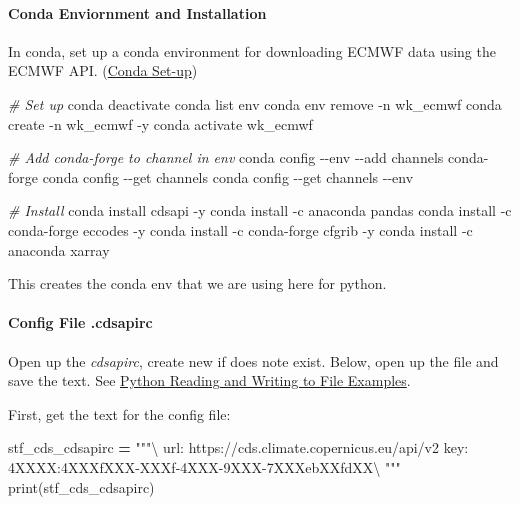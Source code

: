 \documentclass[
]{book}
\newenvironment{Shaded}{\begin{snugshade}}{\end{snugshade}}
\newcommand{\BuiltInTok}[1]{#1}
\newcommand{\CommentTok}[1]{\textcolor[rgb]{0.56,0.35,0.01}{\textit{#1}}}
\newcommand{\ExtensionTok}[1]{#1}
\newcommand{\NormalTok}[1]{#1}
\newcommand{\OperatorTok}[1]{\textcolor[rgb]{0.81,0.36,0.00}{\textbf{#1}}}
\newcommand{\StringTok}[1]{\textcolor[rgb]{0.31,0.60,0.02}{#1}}
\begin{document}
\hypertarget{conda-enviornment-and-installation}{%
\paragraph{Conda Enviornment and Installation}\label{conda-enviornment-and-installation}}

In conda, set up a conda environment for downloading ECMWF data using the ECMWF API. (\href{https://fanwangecon.github.io/Tex4Econ/nontex/install/windows/fn_installations.html}{Conda Set-up})

\begin{Shaded}
\begin{Highlighting}[]
\CommentTok{\# Set up}
\ExtensionTok{conda}\NormalTok{ deactivate}
\ExtensionTok{conda}\NormalTok{ list env}
\ExtensionTok{conda}\NormalTok{ env remove {-}n wk\_ecmwf}
\ExtensionTok{conda}\NormalTok{ create {-}n wk\_ecmwf {-}y}
\ExtensionTok{conda}\NormalTok{ activate wk\_ecmwf}

\CommentTok{\# Add conda{-}forge to channel in env}
\ExtensionTok{conda}\NormalTok{ config {-}{-}env {-}{-}add channels conda{-}forge}
\ExtensionTok{conda}\NormalTok{ config {-}{-}get channels}
\ExtensionTok{conda}\NormalTok{ config {-}{-}get channels {-}{-}env}

\CommentTok{\# Install}
\ExtensionTok{conda}\NormalTok{ install cdsapi {-}y}
\ExtensionTok{conda}\NormalTok{ install {-}c anaconda pandas}
\ExtensionTok{conda}\NormalTok{ install {-}c conda{-}forge eccodes {-}y}
\ExtensionTok{conda}\NormalTok{ install {-}c conda{-}forge cfgrib {-}y}
\ExtensionTok{conda}\NormalTok{ install {-}c anaconda xarray}
\end{Highlighting}
\end{Shaded}

This creates the conda env that we are using here for python.

\hypertarget{config-file-.cdsapirc}{%
\paragraph{Config File .cdsapirc}\label{config-file-.cdsapirc}}

Open up the \emph{cdsapirc}, create new if does note exist. Below, open up the file and save the text. See \href{https://fanwangecon.github.io/pyfan/vig/support/inout/htmlpdfr/fp_files.html}{Python Reading and Writing to File Examples}.

First, get the text for the config file:

\begin{Shaded}
\begin{Highlighting}[]
\NormalTok{stf\_cds\_cdsapirc }\OperatorTok{=} \StringTok{"""\textbackslash{}}
\StringTok{url: https://cds.climate.copernicus.eu/api/v2}
\StringTok{key: 4XXXX:4XXXfXXX{-}XXXf{-}4XXX{-}9XXX{-}7XXXebXXfdXX\textbackslash{}}
\StringTok{"""}
\BuiltInTok{print}\NormalTok{(stf\_cds\_cdsapirc)}
\end{Highlighting}
\end{Shaded}
\end{document}
